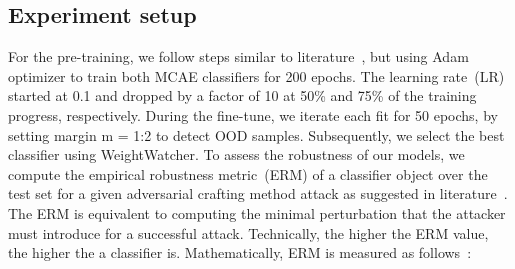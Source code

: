 \subsection{Experiment setup}
For the pre-training, we follow steps similar to literature~\cite{OOD19}, but using Adam optimizer to train both MCAE classifiers for 200 epochs. The learning rate~(LR) started at 0.1 and dropped by a factor of 10 at 50\% and 75\% of the training progress, respectively. During the fine-tune, we iterate each fit for 50 epochs, by setting margin m = 1:2 to detect OOD samples. Subsequently, we select the best classifier using WeightWatcher. %
To assess the robustness of our models, we compute the empirical robustness metric~(ERM) of a classifier object over the test set for a given adversarial crafting method attack as suggested in literature~\cite{moosavi2016deepfool}. The ERM is equivalent to computing the minimal perturbation that the attacker must introduce for a successful attack. Technically, the higher the ERM value, the higher the a classifier is. Mathematically, ERM is measured as follows~\cite{moosavi2016deepfool}:


